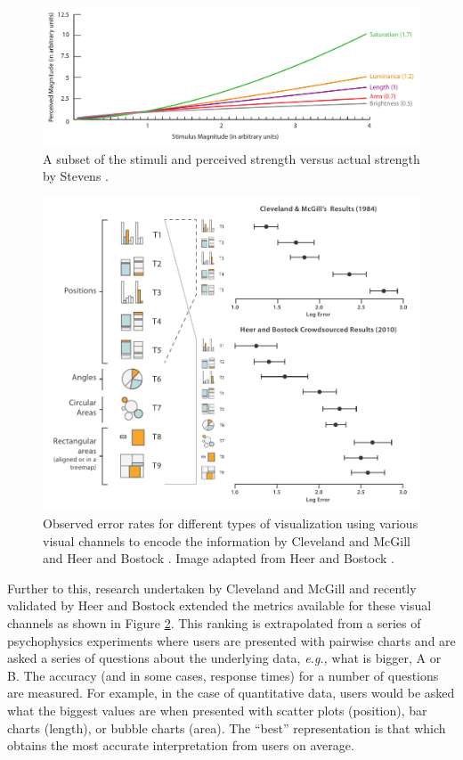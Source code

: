 \begin{figure}[h!]
\centering
\includegraphics[width=\textwidth]{images/related-work/stevens-psychometrics.pdf}
\caption{A subset of the stimuli and perceived strength versus actual strength by Stevens \cite{stevens1975}.}
\label{fig:stevens-results}
\end{figure}


\begin{figure}[h!]
\centering
\includegraphics[width=\textwidth]{images/related-work/cleveland_heer_results}
\caption{Observed error rates for different types of visualization using various visual channels to encode the information by Cleveland and McGill \cite{cleveland1984graphical} and Heer and Bostock \cite{heer2010crowdsourcing}. Image adapted from Heer and Bostock \cite{heer2010crowdsourcing}.}
\label{fig:cleveland_heer_results}
\end{figure}

Further to this, research undertaken by Cleveland and McGill \cite{cleveland1984graphical} and recently validated by Heer and Bostock \cite{heer2010crowdsourcing} extended the metrics available for these visual channels as shown in Figure \ref{fig:cleveland_heer_results}. 
This ranking is extrapolated from a series of psychophysics experiments where users are presented with pairwise charts and are asked a series of questions about the underlying data, \emph{e.g.,} what is bigger, A or B. 
The accuracy (and in some cases, response times) for a number of questions are measured. 
For example, in the case of quantitative data, users would be asked what the biggest values are when presented with scatter plots (position), bar charts (length), or bubble charts (area). 
The ``best'' representation is that which obtains the most accurate interpretation from users on average. 

